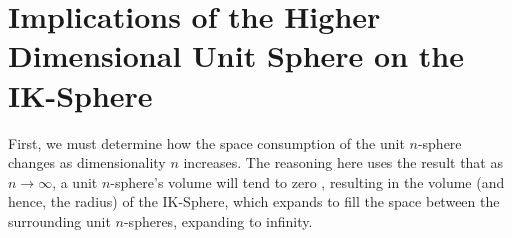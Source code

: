 

\section{Implications of the Higher Dimensional Unit Sphere on the IK-Sphere}
First, we must determine how the space consumption of the unit $n$-sphere changes as dimensionality $n$ increases. The reasoning here uses the result that as $n \to \infty$, a unit $n$-sphere's volume will tend to zero \cite{athreya2008unit}, resulting in the volume (and hence, the radius) of the IK-Sphere, which expands to fill the space between the surrounding unit $n$-spheres, expanding to infinity. 

